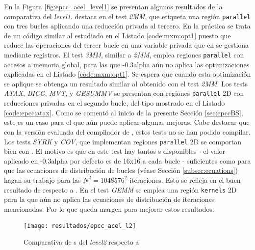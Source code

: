 En la Figura \ref{fig:epcc_acel_level1} se presentan algunos resultados de la comparativa
del \textit{level1}. \accULL{} destaca en el test \textit{2MM}, que etiqueta una región 
\texttt{parallel} con tres bucles aplicando una reducción privada al tercero. En la 
práctica
se trata de un código similar al estudiado en el Listado \ref{code:mxm:opt1} puesto que
reduce las operaciones del tercer bucle en una variable privada que en \GPU{} se gestiona
mediante registros.
El test \textit{3MM}, similar a \textit{2MM}, emplea regiones \texttt{parallel} con 
accesos a memoria 
global, para las que \accULL{}-0.3alpha aún no aplica las optimizaciones explicadas en el 
Listado \ref{code:mxm:opt1}. %
Se espera que cuando esta optimización se aplique se obtenga un resultado similar al
obtenido con el test \textit{2MM}.
Los tests \textit{ATAX}, \textit{BICG}, \textit{MVT}, y \textit{GESUMMV} se presentan con 
regiones \texttt{parallel} 2D con 
reducciones privadas en el segundo bucle, del tipo mostrado en el Listado 
\ref{code:epcc:atax}. Como se comentó al inicio de la presente Sección \ref{sec:epccBS},
este es un caso para el que \accULL{} aún puede aplicar algunas mejoras. Cabe destacar que 
con la versión evaluada del compilador de \CAPS{}, estos tests no se han podido compilar. 
Los tests \textit{SYRK} y \textit{COV}, que implementan regiones \texttt{parallel} 2D se 
comportan bien con \accULL{}. El motivo es que en este test hay tantos
\thread{}s disponibles - el valor aplicado en \accULL{}-0.3alpha por defecto es de 16x16 a 
cada bucle - suficientes como para que las ecuaciones de distribución de bucles (véase 
Sección \ref{subsec:ecuations}) hagan su trabajo para las $N^2 = 1048576^2$ iteraciones. 
Esto se refleja en el buen resultado de \accULL{} respecto a \PGI{}. 
En el test \textit{GEMM} se emplea una región \texttt{kernels} 2D para la que \accULL{} 
aún no aplica las ecuaciones de distribución de iteraciones mencionadas. Por lo que queda 
margen para mejorar estos resultados. 

\begin{figure}[!tbh]
   \centering
   \texttt{[image: resultados/epcc\_acel\_l2]}
   \caption{Comparativa de \benchmark{}s del \textit{level2} respecto a \PGI{}}
   \label{fig:epcc_acel_level2}
\end{figure}

